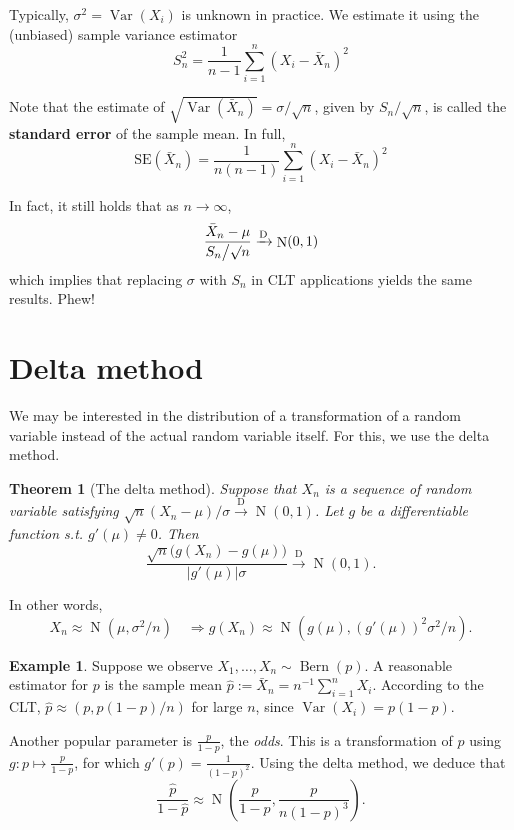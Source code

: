 \documentclass[
]{book}
\DeclareMathOperator{\Var}{Var}
\DeclareMathOperator{\N}{N}
\DeclareMathOperator{\Bern}{Bern}
\newtheorem{theorem}{Theorem}[chapter]
\theoremstyle{definition}
\theoremstyle{definition}
\newtheorem{example}{Example}[chapter]
\theoremstyle{definition}
\theoremstyle{definition}
\theoremstyle{remark}
\begin{document}
Typically, \(\sigma^2 = \Var(X_i)\) is unknown in practice.
We estimate it using the (unbiased) sample variance estimator
\[S_n^2 = \frac{1}{n-1} \sum_{i=1}^n (X_i - \bar X_n)^2\]

Note that the estimate of \(\sqrt{\Var(\bar X_n)} = \sigma/\surd n\), given by \(S_n/\surd n\), is called the \textbf{standard error} of the sample mean.
In full,
\[\text{SE}(\bar X_n) = \frac{1}{n(n-1)}\sum_{i=1}^n (X_i - \bar X_n)^2\]

In fact, it still holds that as \(n\to\infty\),
\[\frac{\bar X_n - \mu}{S_n\big/\surd n} \xrightarrow{\text D} \N(0,1)\]
which implies that replacing \(\sigma\) with \(S_n\) in CLT applications yields the same results. Phew!

\hypertarget{delta-method}{%
\section{Delta method}\label{delta-method}}

We may be interested in the distribution of a transformation of a random variable instead of the actual random variable itself.
For this, we use the delta method.

\begin{theorem}[The delta method]
Suppose that \(X_n\) is a sequence of random variable satisfying \(\sqrt n(X_n - \mu)/\sigma {\xrightarrow{\text{D}}} \N(0,1)\).
Let \(g\) be a differentiable function s.t. \(g'(\mu)\neq 0\). Then
\[
\frac{\sqrt n \big(g(X_n)-g(\mu)\big)}{|g'(\mu)|\sigma} {\xrightarrow{\text{D}}} \N(0,1).
\]
\end{theorem}

In other words,
\[
  X_n \approx \N\left( \mu, \sigma^2/n \right) \hspace{1em} \Rightarrow g(X_n) \approx \N \left( g(\mu), (g'(\mu))^2\sigma^2/n \right).
\]

\begin{example}
Suppose we observe \(X_1,\dots,X_n\sim\Bern(p)\).
A reasonable estimator for \(p\) is the sample mean \(\hat p := \bar X_n = n^{-1}\sum_{i=1}^n X_i\).
According to the CLT, \(\hat p \approx (p, p(1-p)/n)\) for large \(n\), since \(\Var(X_i)=p(1-p)\).

Another popular parameter is \(\frac{p}{1-p}\), the \textit{odds}.
This is a transformation of \(p\) using \(g:p \mapsto \frac{p}{1-p}\), for which \(g'(p) = \frac{1}{(1-p)^2}\).
Using the delta method, we deduce that
\[
\frac{\hat p}{1-\hat p} \approx \N \left(\frac{p}{1-p}, \frac{p}{n(1-p)^3}  \right).
\]
\end{example}
\end{document}

